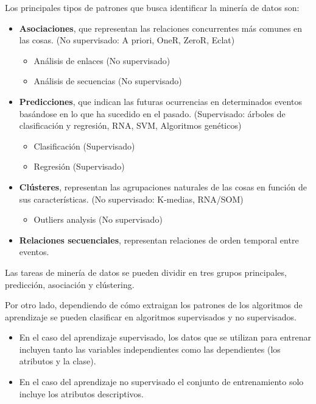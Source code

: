 \documentclass[12pt, twoside, openright]{report} %
\begin{document}
Los principales tipos de patrones que busca identificar la minería de datos son:
\begin{itemize}
	\item \textbf{Asociaciones}, que representan las relaciones concurrentes más comunes en las cosas. (No supervisado: A priori, OneR, ZeroR, Eclat)
	      \begin{itemize}
		      \item Análisis de enlaces (No supervisado)
		      \item Análisis de secuencias (No supervisado)
	      \end{itemize}
	\item \textbf{Predicciones}, que indican las futuras ocurrencias en determinados eventos basándose en lo que ha sucedido en el pasado. (Supervisado: árboles de clasificación y regresión, RNA, SVM, Algoritmos genéticos)
	      \begin{itemize}
		      \item Clasificación (Supervisado)
		      \item Regresión (Supervisado)
	      \end{itemize}
	\item \textbf{Clústeres}, representan las agrupaciones naturales de las cosas en función de sus características. (No supervisado: K-medias, RNA/SOM)
	      \begin{itemize}
		      \item Outliers analysis (No supervisado)
	      \end{itemize}
	\item \textbf{Relaciones secuenciales}, representan relaciones de orden temporal entre eventos.
\end{itemize}

Las tareas de minería de datos se pueden dividir en tres grupos principales, predicción, asociación y clústering.

Por otro lado, dependiendo de cómo extraigan los patrones de los algoritmos de aprendizaje se pueden clasificar en algoritmos supervisados y no supervisados.
\begin{itemize}
	\item En el caso del aprendizaje supervisado, los datos que se utilizan para entrenar incluyen tanto las variables independientes como las dependientes (los atributos y la clase).
	\item En el caso del aprendizaje no supervisado el conjunto de entrenamiento solo incluye los atributos descriptivos.
\end{itemize}
\end{document}
